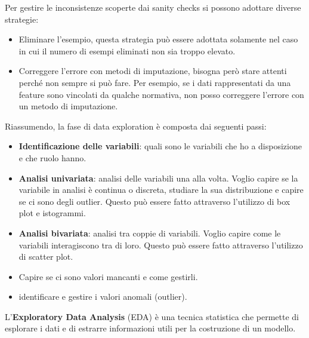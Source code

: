 Per gestire le inconsistenze scoperte dai sanity checks si possono adottare diverse
strategie:
\begin{itemize}
      \item Eliminare l'esempio, questa strategia può essere adottata solamente
            nel caso in cui il numero di esempi eliminati non sia troppo elevato.
      \item Correggere l'errore con metodi di imputazione, bisogna però stare
            attenti perché non sempre si può fare. Per esempio, se i dati
            rappresentati da una feature sono vincolati da qualche normativa,
            non posso correggere l'errore con un metodo di imputazione.
\end{itemize}
Riassumendo, la fase di data exploration è composta dai seguenti passi:
\begin{itemize}
      \item \textbf{Identificazione delle variabili}: quali sono le variabili che ho
            a disposizione e che ruolo hanno.
      \item \textbf{Analisi univariata}: analisi delle variabili una alla volta.
            Voglio capire se la variabile in analisi è continua o discreta,
            studiare la sua distribuzione e capire se ci sono degli outlier. Questo
            può essere fatto attraverso l'utilizzo di box plot e istogrammi.
      \item \textbf{Analisi bivariata}: analisi tra coppie di variabili. Voglio
            capire come le variabili interagiscono tra di loro. Questo può essere
            fatto attraverso l'utilizzo di scatter plot.
      \item Capire se ci sono valori mancanti e come gestirli.
      \item identificare e gestire i valori anomali (outlier).
\end{itemize}
\begin{definizione}
      L'\textbf{Exploratory Data Analysis} (EDA) è una tecnica statistica che permette
      di esplorare i dati e di estrarre informazioni utili per la costruzione di un
      modello.
\end{definizione}

